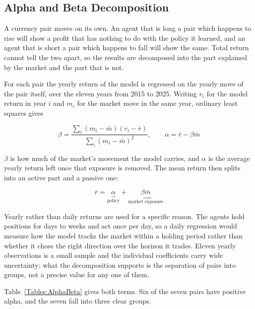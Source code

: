 \subsection{Alpha and Beta Decomposition}
\label{Subsection:AlphaBeta}

A currency pair moves on its own. An agent that is long a pair which happens to rise will show a profit that has nothing to do with the policy it learned, and an agent that is short a pair which happens to fall will show the same. Total return cannot tell the two apart, so the results are decomposed into the part explained by the market and the part that is not.

For each pair the yearly return of the model is regressed on the yearly move of the pair itself, over the eleven years from 2015 to 2025. Writing $r_i$ for the model return in year $i$ and $m_i$ for the market move in the same year, ordinary least squares gives

\begin{equation}
\beta = \frac{\sum_i (m_i - \bar{m})(r_i - \bar{r})}{\sum_i (m_i - \bar{m})^2}, \qquad \alpha = \bar{r} - \beta \bar{m}
\label{Equation:AlphaBeta}
\end{equation}

$\beta$ is how much of the market's movement the model carries, and $\alpha$ is the average yearly return left once that exposure is removed. The mean return then splits into an active part and a passive one:

\begin{equation}
\bar{r} = \underbrace{\alpha}_{\text{policy}} + \underbrace{\beta \bar{m}}_{\text{market exposure}}
\label{Equation:AlphaDecomposition}
\end{equation}

Yearly rather than daily returns are used for a specific reason. The agents hold positions for days to weeks and act once per day, so a daily regression would measure how the model tracks the market within a holding period rather than whether it chose the right direction over the horizon it trades. Eleven yearly observations is a small sample and the individual coefficients carry wide uncertainty; what the decomposition supports is the separation of pairs into groups, not a precise value for any one of them.

Table~\ref{Tables:AlphaBeta} gives both terms. Six of the seven pairs have positive alpha, and the seven fall into three clear groups.



